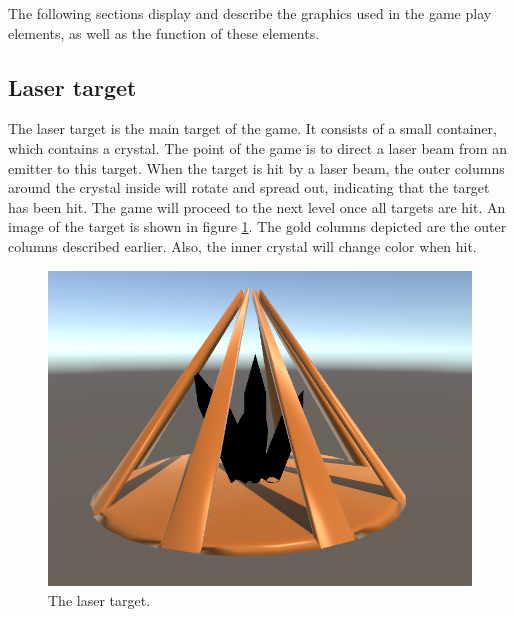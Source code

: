 		The following sections display and describe the graphics used in the 
		game play elements, as well as the function of these elements.
		
		\subsection{Laser target} \label{ssec:lasertarget}
			The laser target is the main target of the game. It consists of
			a small container, which contains a crystal. The point of the
			game is to direct a laser beam from an emitter to this target.
			When the target is hit by a laser beam, the outer columns around
			the crystal inside will rotate and spread out, indicating that
			the target has been hit. The game will proceed to the
			next level once all targets are hit. An image of the target is shown in figure 
			\ref{fig:target}. The gold columns depicted are the outer columns
			described earlier. Also, the inner crystal will change color
			when hit.
			\begin{figure}[!ht]
				\centering
				\includegraphics[scale = 0.4]{Target}
				\caption{The laser target.}
				\label{fig:target}
			\end{figure}
			
